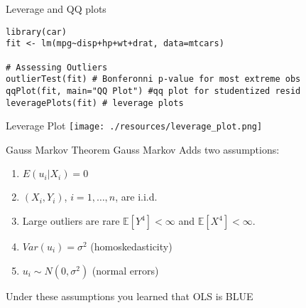 \documentclass[aspectratio=169]{beamer}
\newcommand{\E}{\mathbb{E}}
\begin{document}
\begin{frame}[fragile]{Leverage and QQ plots}
\begin{verbatim}
library(car)
fit <- lm(mpg~disp+hp+wt+drat, data=mtcars)

# Assessing Outliers
outlierTest(fit) # Bonferonni p-value for most extreme obs
qqPlot(fit, main="QQ Plot") #qq plot for studentized resid 
leveragePlots(fit) # leverage plots
\end{verbatim}
\end{frame}

\begin{frame}{Leverage Plot}
\texttt{[image: ./resources/leverage\_plot.png]}
\end{frame}




\begin{frame}{Gauss Markov Theorem}
Gauss Markov Adds two assumptions:
\begin{enumerate}
\item $E(u_i |X_i ) = 0$
\item $(X_i,Y_i)$, $i =1,\ldots,n$, are i.i.d.
\item Large outliers are rare $\E[Y^4]< \infty$ and $\E[X^4]<\infty$.
\item $Var(u_i) = \sigma^2$ (homoskedasticity)
\item $u_i \sim N(0,\sigma^2)$ (normal errors)
\end{enumerate}
Under these assumptions you learned that OLS is \alert{BLUE}
\end{frame}
\end{document}
